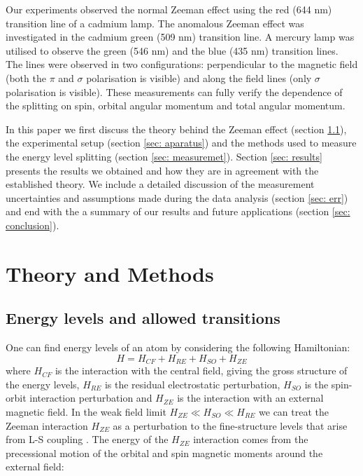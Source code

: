 \documentclass[11pt]{article}
\begin{document}
Our experiments observed the normal Zeeman effect using the red (644 nm) transition line of a cadmium lamp. The anomalous Zeeman effect was investigated in the cadmium green (509  nm) transition line. A mercury lamp was utilised to observe the green (546 nm) and the blue (435 nm) transition lines. The lines were observed in two configurations: perpendicular to the magnetic field (both the $\pi$ and $\sigma$ polarisation is visible) and along the field lines (only $\sigma$ polarisation is visible). These measurements can fully verify the dependence of the splitting on spin, orbital angular momentum and total angular momentum. 

In this paper we first discuss the theory behind the Zeeman effect (section \ref{sec: theory}), the experimental setup (section \ref{sec: aparatus}) and the methods used to measure the energy level splitting (section \ref{sec: measuremet}). Section \ref{sec: results} presents the results we obtained and how they are in agreement with the established theory. We include a detailed discussion of the measurement uncertainties and assumptions made during the data analysis (section \ref{sec: err}) and end with the a summary of our results and future applications (section \ref{sec: conclusion}). 


\section{Theory and Methods}
\subsection{Energy levels and allowed transitions} \label{sec: theory}
One can find energy levels of an atom by considering the following Hamiltonian: 
\begin{equation}
    H = H_{CF} + H_{RE} + H_{SO} + H_{ZE} \label{eq: atomic ham}
\end{equation}
where $H_{CF}$ is the interaction with the central field, giving the gross structure of the energy levels, $H_{RE}$ is the residual electrostatic perturbation, $H_{SO}$ is the spin-orbit interaction perturbation and $H_{ZE}$ is the interaction with an external magnetic field. In the weak field limit $H_{ZE} \ll H_{SO} \ll H_{RE}$ we can treat the Zeeman interaction $H_{ZE}$ as a perturbation to the fine-structure levels that arise from L-S coupling \cite{Binney_Skinner_2015}. The energy of the $H_{ZE}$ interaction comes from the precessional motion of the orbital and spin magnetic moments around the external field: 
\end{document}

